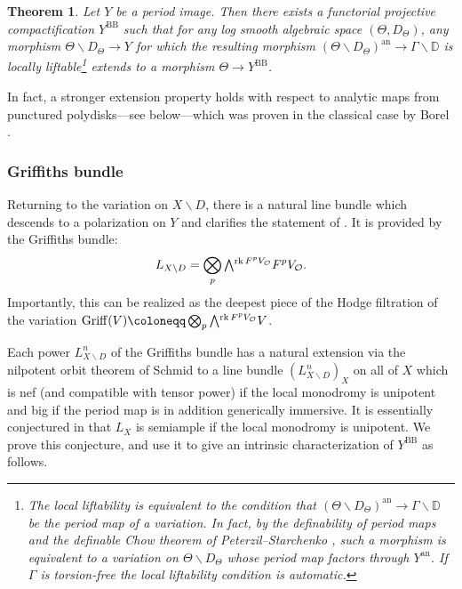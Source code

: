 \documentclass{amsart}
\newcommand{\bs}{\backslash}
\newcommand{\an}{\operatorname{an}}
\newtheorem{thm}[theorem]{Theorem}
\theoremstyle{definition}
\theoremstyle{remark}
\def\bD{\mathbb{D}}
\def\cO{\mathcal{O}}
\def\an{\mathrm{an}}
\def\rk{\operatorname{rk}}
\def\BB{\mathrm{BB}}
\numberwithin{equation}{section}
\newcommand{\marg}[1]{\normalsize{{\color{red}\footnote{{\color{blue}#1}}}{\marginpar[{\color{red}\hfill\tiny\thefootnote$\rightarrow$}]{{\color{red}$\leftarrow$\tiny\thefootnote}}}}}
\newcommand{\mir}[1]{\marg{(Mirko) #1}}
\newcommand{\Exterior}{\mathchoice{{\textstyle\bigwedge}}%
    {{\bigwedge}}%
    {{\textstyle\wedge}}%
    {{\scriptstyle\wedge}}}
\newcommand{\bencol}[1]{{\color{teal}(ben) #1}}
\def\testsp{\Theta}
\begin{document}
\begin{thm}\label{thm:BBmain1}%
Let $Y$ be a period image. Then there exists a functorial projective compactification $Y^{\BB}$ such that for any log smooth algebraic space $(\testsp,D_\testsp)$, any morphism $\testsp\bs D_\testsp\to Y$ for which the resulting morphism $(\testsp\bs D_\testsp)^\an\to \Gamma\bs\bD$ is locally liftable\footnote{The local liftability is equivalent to the condition that $(\testsp\bs D_\testsp)^\an\to\Gamma\bs\bD$ be the period map of a variation.  In fact, by the
definability of period maps \cite[Theorem 1.3]{bkt} and the definable Chow theorem of Peterzil--Starchenko \cite[Corollary 4.5]{definechow}, such a morphism is equivalent to a variation on $\testsp\bs D_\testsp$ whose period map factors through $Y^\an$.  If $\Gamma$ is torsion-free the local liftability condition is automatic.} extends to a morphism $\testsp\to Y^{\BB}$. 

\end{thm}
In fact, a stronger extension property holds with respect to analytic maps from punctured polydisks---see  below---which was proven in the classical case by Borel \cite{borelextend}.


\def\Grif{\operatorname{Griff}}
\subsubsection{Griffiths bundle}
Returning to the variation on $X\bs D$, there is a natural line bundle which descends to a polarization on $Y$ and clarifies the statement of .  It is provided by the Griffiths bundle:
$$L_{X\bs D}=\bigotimes_p \Exterior^{\rk F^pV_{\cO}} F^pV_{\cO}.$$
Importantly, this can be realized as the deepest piece of the Hodge filtration of the variation $\Grif(V)\coloneqq  \bigotimes_p \Exterior^{\rk F^pV_{\cO}} V$.

Each power $L_{X\bs D}^n$ of the Griffiths bundle has a natural extension via the nilpotent orbit theorem of Schmid \cite{Schmid} to a line bundle $(L^n_{X\bs D})_X$ on all of $X$ which is nef (and compatible with tensor power) if the local monodromy is unipotent and big if the period map is in addition generically immersive.   It is essentially conjectured in \cite{GGLR17} that $L_X$ is semiample if the local monodromy is unipotent. We prove this conjecture, and use it to give an intrinsic characterization of $Y^{\BB}$ as follows.
\end{document}
